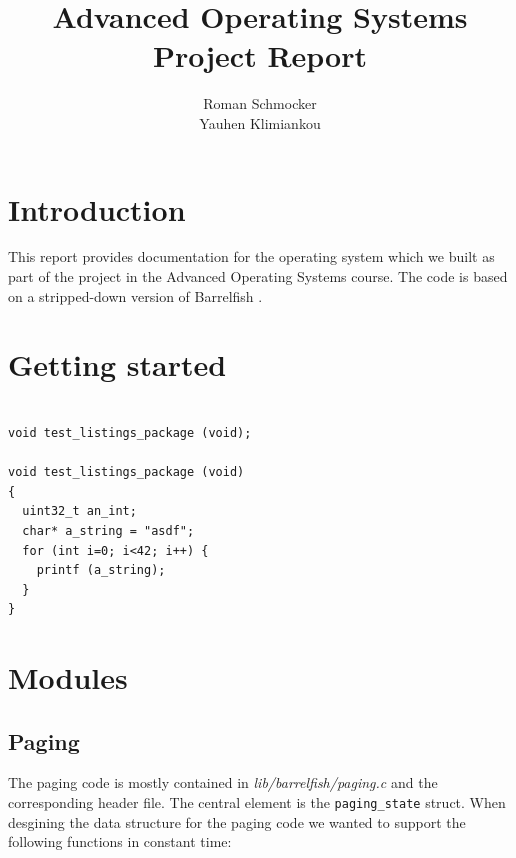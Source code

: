 \documentclass[a4paper,10pt]{article}
\title{Advanced Operating Systems \\ Project Report}
\author{Roman Schmocker \\ Yauhen Klimiankou}
\newcommand{\filepath}[1]{\emph{ #1}}
\begin{document}
\maketitle


\section{Introduction}

This report provides documentation for the operating system which we built as part of the project in the Advanced Operating Systems course.
The code is based on a stripped-down version of Barrelfish \cite {web:barrelfish}.


\section{Getting started}

\begin{lstlisting}

void test_listings_package (void);

void test_listings_package (void)
{
  uint32_t an_int;
  char* a_string = "asdf";
  for (int i=0; i<42; i++) {
    printf (a_string);
  }
}
\end{lstlisting}


\section {Modules}

\subsection{Paging}

% 
% 
% 

The paging code is mostly contained in \filepath{lib/barrelfish/paging.c} and the corresponding header file.
The central element is the \lstinline!paging_state! struct.
When desgining the data structure for the paging code we wanted to support the following functions in constant time:
\end{document}
